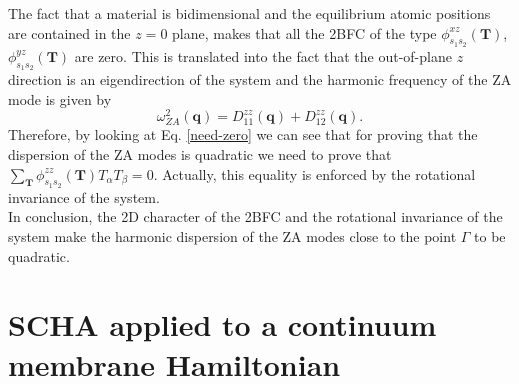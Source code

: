 The fact that a material is bidimensional and the equilibrium atomic positions are contained in the $z=0$ plane,
makes that all the 2BFC of the type $\phi_{s_{1}s_{2}}^{xz}(\mathbf{T})$, $\phi_{s_{1}s_{2}}^{yz}(\mathbf{T})$ are zero. This is translated into the fact that the out-of-plane $z$ direction is an eigendirection of the system and the 
harmonic frequency of the ZA mode is given by
\begin{equation} 
\omega_{ZA}^{2}(\mathbf{q})=D_{11}^{zz}(\mathbf{q})+D_{12}^{zz}(\mathbf{q}). 
\end{equation} 
Therefore, by looking at Eq. \ref{need-zero} we can see that for proving that the dispersion of the ZA modes is quadratic we need to prove that 
$\sum_{\mathbf{T}}\phi_{s_{1}s_{2}}^{zz}(\mathbf{T})T_{\alpha}T_{\beta}=0$. Actually, this equality is enforced by the rotational invariance of the system. \\

In conclusion, the 2D character of the 2BFC and the rotational invariance of the system make the harmonic dispersion of the ZA modes close to the point $\Gamma$ to be quadratic.

\section{SCHA applied to a continuum membrane Hamiltonian}

